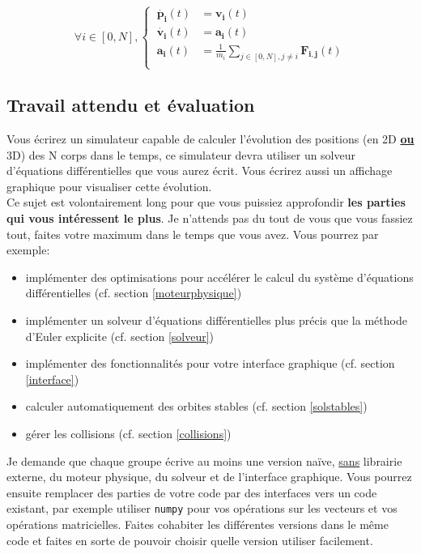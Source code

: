 \documentclass{article}
\newcommand{\myvec}[1]{\ensuremath{\mathbf{#1}}}
\begin{document}
\begin{equation*}
\forall i \in [0,N], \left\{\begin{aligned}
    \ \myvec{\dot{p_i}}(t) & = \myvec{v_i}(t) \\
    \ \myvec{\dot{v_i}}(t) & = \myvec{a_i}(t) \\
    \ \myvec{a_i}(t) & = \frac{1}{m_i} \sum_{j \in [0,N], j \ne i} \myvec{F_{i,j}}(t) \\
\end{aligned}\right.
\end{equation*}

\subsection{Travail attendu et évaluation}

Vous écrirez un simulateur capable de calculer l'évolution des positions (en 2D \textbf{\underline{ou}} 3D) des N corps dans le temps, ce simulateur devra utiliser un solveur d'équations différentielles que vous aurez écrit. Vous écrirez aussi un affichage graphique pour visualiser cette évolution. \\
Ce sujet est volontairement long pour que vous puissiez approfondir \textbf{les parties qui vous intéressent le plus}. Je n'attends pas du tout de vous que vous fassiez tout, faites votre maximum dans le temps que vous avez. Vous pourrez par exemple:
\begin{itemize}
    \item implémenter des optimisations pour accélérer le calcul du système d'équations différentielles (cf. section \ref{moteurphysique})
    \item implémenter un solveur d'équations différentielles plus précis que la méthode d'Euler explicite (cf. section \ref{solveur})
    \item implémenter des fonctionnalités pour votre interface graphique (cf. section \ref{interface})
    \item calculer automatiquement des orbites stables (cf. section \ref{solstables})
    \item gérer les collisions (cf. section \ref{collisions})
\end{itemize}
Je demande que chaque groupe écrive au moins une version naïve, \underline{sans} librairie externe, du moteur physique, du solveur et de l'interface graphique. Vous pourrez ensuite remplacer des parties de votre code par des interfaces vers un code existant, par exemple utiliser \verb!numpy! pour vos opérations sur les vecteurs et vos opérations matricielles. Faites cohabiter les différentes versions dans le même code et faites en sorte de pouvoir choisir quelle version utiliser facilement.\\
\end{document}

